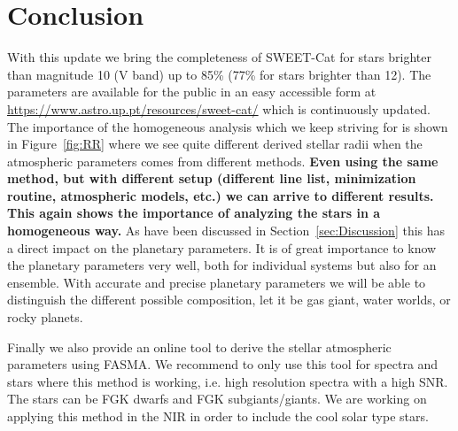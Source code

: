 \documentclass{aa}
\begin{document}
\section{Conclusion}
\label{sec:conclusion}

With this update we bring the completeness of SWEET-Cat for stars brighter than
magnitude 10 (V band) up to 85\% (77\% for stars brighter than 12). The
parameters are available for the public in an easy accessible form at
\url{https://www.astro.up.pt/resources/sweet-cat/} which is continuously
updated. The importance of the homogeneous analysis which we keep striving for
is shown in Figure~\ref{fig:RR} where we see quite different derived stellar
radii when the atmospheric parameters comes from different methods. {\bf Even
using the same method, but with different setup (different line list,
minimization routine, atmospheric models, etc.) we can arrive to different
results. This again shows the importance of analyzing the stars in a homogeneous
way.} As have been discussed in Section~\ref{sec:Discussion} this has a direct
impact on the planetary parameters. It is of great importance to know the
planetary parameters very well, both for individual systems but also for an
ensemble. With accurate and precise planetary parameters we will be able to
distinguish the different possible composition, let it be gas giant, water
worlds, or rocky planets.

Finally we also provide an online tool to derive the stellar atmospheric
parameters using FASMA. We recommend to only use this tool for spectra and stars
where this method is working, i.e. high resolution spectra with a high SNR. The
stars can be FGK dwarfs and FGK subgiants/giants. We are working on applying
this method in the NIR in order to include the cool solar type stars.
\end{document}
